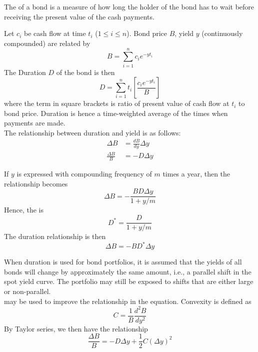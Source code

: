 \begin{definition}
The  of a bond is a measure of how long the holder of the bond has to wait before receiving the present value of the cash payments.
\end{definition}

Let $c_i$ be cash flow at time $t_i$ ($1 \leq i \leq n$). Bond price $B$, yield $y$ (continuously compounded) are related by
\begin{equation}
B = \sum\limits_{i=1}^n c_i e^{-y t_i} \nonumber
\end{equation}
The Duration $D$ of the bond is then
\begin{equation}
D = \sum\limits_{i=1}^n t_i \left[ \frac{c_i e^{-y t_i}}{B} \right] \nonumber
\end{equation}
where the term in square brackets is ratio of present value of cash flow at $t_i$ to bond price. Duration is hence a time-weighted average of the times when payments are made.\\
The relationship between duration and yield is as follows:
\begin{align}
\Delta B &= \frac{dB}{dy} \Delta y \nonumber \\
\frac{\Delta B}{B} &= - D \Delta y \nonumber
\end{align}

If $y$ is expressed with compounding frequency of $m$ times a year, then the relationship becomes
\begin{equation}
\Delta B = - \frac{BD \Delta y}{1 + y/m} \nonumber
\end{equation}
Hence, the  is 
\begin{equation}
D^* = \frac{D}{1 + y/m} \nonumber
\end{equation}
The duration relationship is then
\begin{equation}
\Delta B = - B D^* \Delta y \nonumber
\end{equation}

When duration is used for bond portfolios, it is assumed that the yields of all bonds will change by approximately the same amount, i.e., a parallel shift in the spot yield curve. The portfolio may still be exposed to shifts that are either large or non-parallel.\\
 may be used to improve the relationship in the equation. Convexity is defined as
\begin{equation}
C = \frac{1}{B} \frac{d^2 B}{dy^2} \nonumber
\end{equation}
By Taylor series, we then have the relationship
\begin{equation}
\frac{\Delta B}{B} = -D \Delta y + \frac{1}{2}C(\Delta y)^2 \nonumber
\end{equation}

